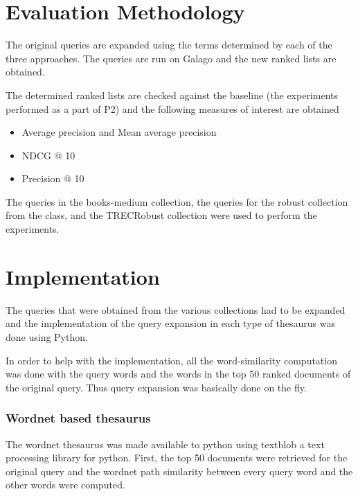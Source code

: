 \documentclass[a4paper, 12pt, notitlepage]{report}
\begin{document}


\chapter{Evaluation Methodology}
The original queries are expanded using the terms determined by each of the three approaches. The queries are run on Galago \cite{galago} and the new ranked lists are obtained. 

The determined ranked lists are checked against the baseline (the experiments performed as a part of P2) and the following measures of interest are obtained
\begin{itemize}
\item Average precision and Mean average precision
\item NDCG @ 10
\item Precision @ 10
\end{itemize}

The queries in the books-medium collection, the queries for the robust collection from the class, and the TRECRobust collection were used to perform the experiments.

\chapter{Implementation}
The queries that were obtained from the various collections had to be expanded and the implementation of the query expansion in each type of thesaurus was done using Python.

In order to help with the implementation, all the word-similarity computation was done with the query words and the words in the top 50 ranked documents of the original query. Thus query expansion was basically done on the fly. 

\subsection*{Wordnet based thesaurus}
The wordnet thesaurus was made available to python using textblob \cite{textblob} a text processing library for python. First, the top 50 documents were retrieved for the original query and the wordnet path similarity between every query word and the other words were computed. 
\end{document}
